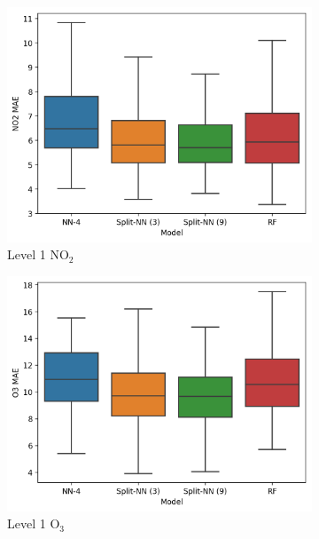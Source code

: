 \documentclass[journal abbreviation, manuscript]{copernicus}
\newcommand{\textus}[1]{$_{\text{#1}}$}
\begin{document}
\iffalse
\begin{figure}[H]
\centering
\begin{subfigure}{0.35\textwidth}
\includegraphics[width=\textwidth]{results/split-no2-location-level1-big-mae}
\caption{Level 1 NO\textus{2}}
\end{subfigure}
\begin{subfigure}{0.35\textwidth}
\includegraphics[width=\textwidth]{results/split-o3-location-level1-big-mae}
\caption{Level 1 O\textus{3}}
\end{subfigure}
\begin{subfigure}{0.35\textwidth}

\end{subfigure}
\end{figure}
\end{document}
